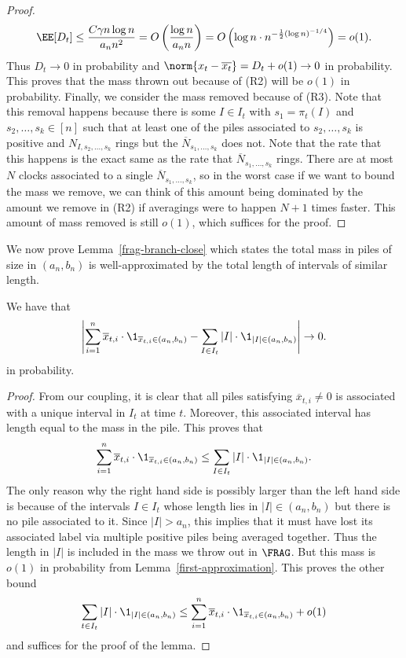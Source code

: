 \documentclass[12pt]{article}
\begin{document}
\begin{proof}
	\[
		\EE [D_t] \leq \frac{C \gamma n \log n}{a_n n^2} = O \left ( \frac{\log n}{a_n n} \right ) = O \left ( \log n \cdot n^{- \frac{1}{2}(\log n)^{-1/4}} \right ) = o(1). 
	\]
	Thus $D_t \to 0$ in probability and $\norm{x_t - \overline{x_t}} = D_t + o(1) \to 0$ in probability. This proves that the mass thrown out because of (R2) will be $o(1)$ in probability. Finally, we consider the mass removed because of (R3). Note that this removal happens because there is some $I \in I_t$ with $s_1 = \pi_t(I)$ and $s_2, \ldots, s_k \in [n]$ such that at least one of the piles associated to $s_2, \ldots, s_k$ is positive and $N_{I, s_2, \ldots, s_k}$ rings but the $\overline{N}_{s_1, \ldots, s_k}$ does not. Note that the rate that this happens is the exact same as the rate that $\overline{N}_{s_1, \ldots, s_k}$ rings. There are at most $N$ clocks associated to a single $\overline{N}_{s_1, \ldots, s_k}$, so in the worst case if we want to bound the mass we remove, we can think of this amount being dominated by the amount we remove in (R2) if averagings were to happen $N+1$ times faster. This amount of mass removed is still $o(1)$, which suffices for the proof. 
\end{proof}

We now prove Lemma~\ref{frag-branch-close} which states the total mass in piles of size in $(a_n, b_n)$ is well-approximated by the total length of intervals of similar length. 
\begin{lem} \label{frag-branch-close}
	We have that
	\[
		\left | \sum_{i = 1}^n \overline{x}_{t, i} \cdot \1_{\overline{x}_{t, i} \in (a_n, b_n)} - \sum_{I \in I_t} |I| \cdot \1_{|I| \in (a_n, b_n)} \right | \to 0. 
	\]
	in probability. 
\end{lem}	
\begin{proof}
	From our coupling, it is clear that all piles satisfying $\overline{x}_{t, i} \neq 0$ is associated with a unique interval in $I_t$ at time $t$. Moreover, this associated interval has length equal to the mass in the pile. This proves that 
	\[
		\sum_{i = 1}^n \overline{x}_{t, i} \cdot \1_{\overline{x}_{t, i} \in (a_n, b_n)} \leq \sum_{I \in I_t} |I| \cdot \1_{|I| \in (a_n, b_n)}.
	\] 
	The only reason why the right hand side is possibly larger than the left hand side is because of the intervals $I \in I_t$ whose length lies in $|I| \in (a_n, b_n)$ but there is no pile associated to it. Since $|I| > a_n$, this implies that it must have lost its associated label via multiple positive piles being averaged together. Thus the length in $|I|$ is included in the mass we throw out in $\FRAG$. But this mass is $o(1)$ in probability from Lemma~\ref{first-approximation}. This proves the other bound
	\[
		\sum_{t \in I_t} |I| \cdot \1_{|I| \in (a_n, b_n)} \leq \sum_{i = 1}^n \overline{x}_{t, i} \cdot \1_{\overline{x}_{t, i} \in (a_n, b_n)} + o(1) 
	\]
	and suffices for the proof of the lemma. 
\end{proof}
\end{document}
